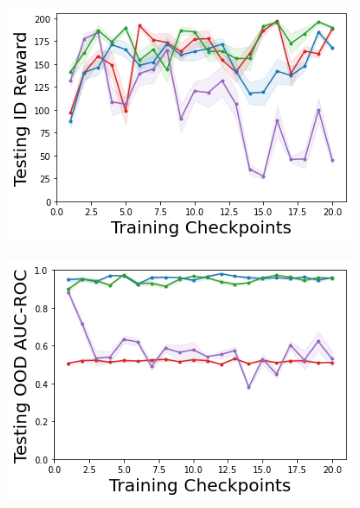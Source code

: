 \begin{figure}
\begin{subfigure}{.23\textwidth}
        \vspace{-5mm}
        \caption{}
        \label{fig:model-training-uncertainty-cartpole}
    \end{subfigure}
    \begin{subfigure}{.23\textwidth}
        \includegraphics[width=\textwidth]{sections/011_icml2022/resources/CartPole-v0-mean_reward_-testing-model.png}
        \vspace{-5mm}
        \caption{}
        \label{fig:model-testing-reward-cartpole}
    \end{subfigure}
    \begin{subfigure}{.23\textwidth}
        \includegraphics[width=\textwidth]{sections/011_icml2022/resources/CartPoleOOD-v0-AUC-ROC-epistemic_-testing-model.png}
        \vspace{-5mm}
        \caption{}
        \label{fig:model-testing-ood-cartpole}

\end{subfigure}
\end{figure}
